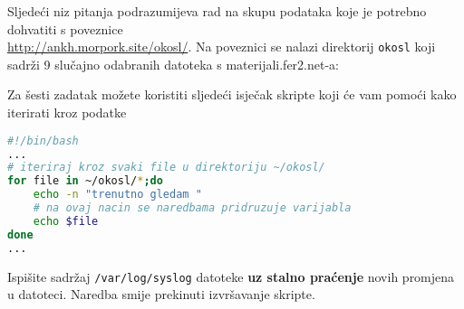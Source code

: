 \documentclass{exam}
\newcommand{\shell}[1]{\texttt{#1}}
\begin{document}
\begin{questions}
\question Sljedeći niz pitanja podrazumijeva rad na skupu podataka koje je potrebno dohvatiti s poveznice \\ \url{http://ankh.morpork.site/okosl/}. Na poveznici se nalazi direktorij \shell{okosl} koji sadrži 9 slučajno odabranih datoteka s materijali.fer2.net-a:

Za šesti zadatak možete koristiti sljedeći isječak skripte koji će vam pomoći kako iterirati kroz podatke

\newpage

\begin{lstlisting}[language=bash,caption={Iteracija kroz podatke}]
#!/bin/bash
...
# iteriraj kroz svaki file u direktoriju ~/okosl/
for file in ~/okosl/*;do
    echo -n "trenutno gledam "
    # na ovaj nacin se naredbama pridruzuje varijabla
    echo $file
done
...
\end{lstlisting}

\question Ispišite sadržaj \shell{/var/log/syslog} datoteke \textbf{uz stalno praćenje} novih promjena u datoteci. Naredba smije prekinuti izvršavanje skripte.

\end{questions}
\end{document}
